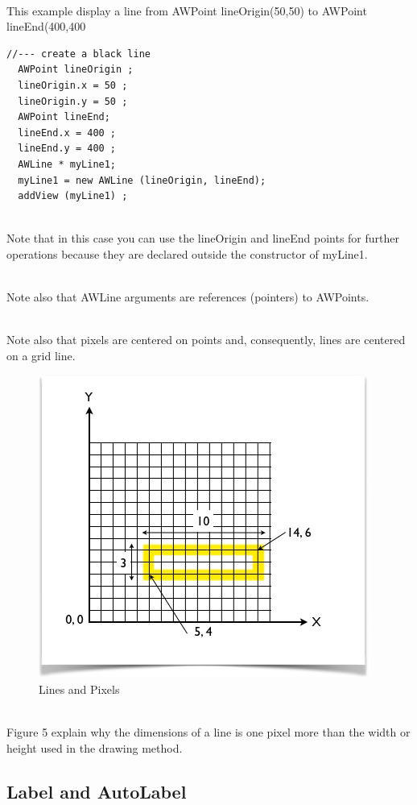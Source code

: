 \documentclass[a4paper,11pt]{extarticle}
\begin{document}
  ~\\ This example display a line from AWPoint lineOrigin(50,50) to AWPoint lineEnd(400,400

\begin{lstlisting}[language=Arduinonl]
//--- create a black line
  AWPoint lineOrigin ;
  lineOrigin.x = 50 ;
  lineOrigin.y = 50 ;
  AWPoint lineEnd;
  lineEnd.x = 400 ;
  lineEnd.y = 400 ;
  AWLine * myLine1;
  myLine1 = new AWLine (lineOrigin, lineEnd); 
  addView (myLine1) ;
 \end{lstlisting}
~\\ Note that in this case you can use the lineOrigin and lineEnd points for further operations because they are declared outside the constructor of myLine1.

~\\ Note also that AWLine arguments are references (pointers) to AWPoints.

~\\ Note also that pixels are centered on points and, consequently, lines are centered on a grid line.

\begin{figure}[htbp]
   \centering
   \includegraphics[scale=0.6]{AWFig5.png} 
   \caption{Lines and Pixels}
   \label{fig:5 }
\end{figure}

~\\ Figure 5 explain why the dimensions of a line is one pixel more than the width or height used in the drawing method.

\newpage
\subsection{Label and AutoLabel}
\end{document}
